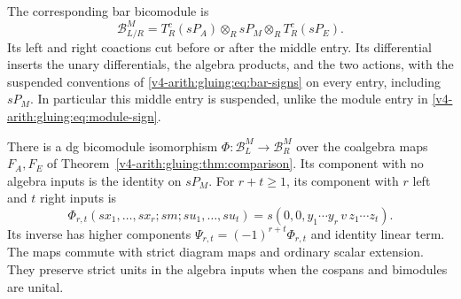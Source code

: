 The corresponding bar bicomodule is
\[
 \mathcal B^M_{L/R}
 =T_R^c(sP_A)\otimes_R sP_M\otimes_R T_R^c(sP_E).
\]
Its left and right coactions cut before or after the middle entry.
Its differential inserts the unary differentials, the algebra
products, and the two actions, with the suspended conventions of
\eqref{v4-arith:gluing:eq:bar-signs} on every entry, including \(sP_M\).
In particular this middle entry is suspended, unlike the module entry
in \eqref{v4-arith:gluing:eq:module-sign}.

\begin{theorem}\label{v4-arith:gluing:thm:bimodules}
There is a dg bicomodule isomorphism
\(\Phi:\mathcal B^M_L\to\mathcal B^M_R\) over the coalgebra maps
\(F_A,F_E\) of Theorem~\ref{v4-arith:gluing:thm:comparison}. Its
component with no algebra inputs is the identity on \(sP_M\). For
\(r+t\geq1\), its component with \(r\) left and \(t\) right inputs is
\begin{equation}\label{v4-arith:gluing:eq:bimodule-taylor}
 \Phi_{r,t}(sx_1,\ldots,sx_r;sm;su_1,\ldots,su_t)
 =s(0,0,y_1\cdots y_r\,v\,z_1\cdots z_t).
\end{equation}
Its inverse has higher components
\(\Psi_{r,t}=(-1)^{r+t}\Phi_{r,t}\) and identity linear term.
The maps commute with strict diagram maps and ordinary scalar
extension. They preserve strict units in the algebra inputs when
the cospans and bimodules are unital.
\end{theorem}

